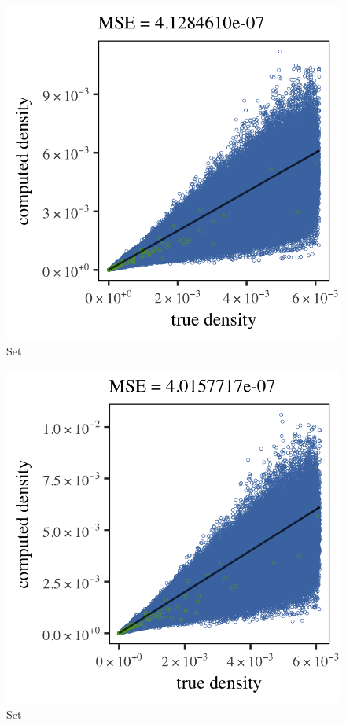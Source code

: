 \begin{subfigure}{0.3\textwidth}
	\centering
	\includegraphics[keepaspectratio=true, width=\textwidth, height=0.23\textheight]{4/img/results_baakman_4_600000_mbe_silverman}
	\caption{Set \baakmanFour}
	\label{fig:4:simulated:datasets:mbe:baakman4}
\end{subfigure}	
\begin{subfigure}{0.3\textwidth}
	\centering
	\includegraphics[keepaspectratio=true, width=\textwidth, height=0.23\textheight]{4/img/results_baakman_5_600000_mbe_silverman}
	\caption{Set \baakmanFive}
	\label{fig:4:simulated:datasets:mbe:baakman5}
\end{subfigure}		
